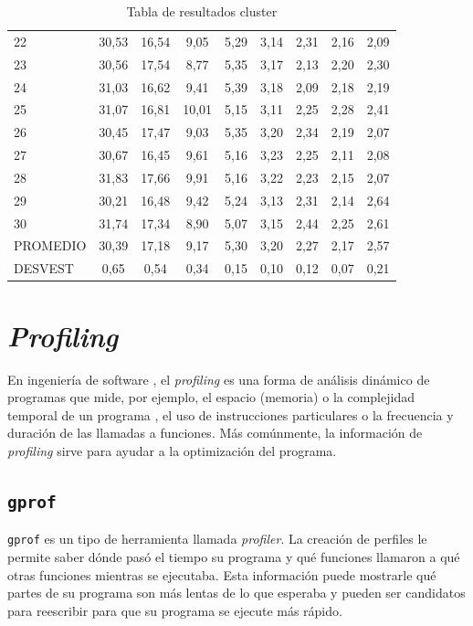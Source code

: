 \documentclass[a4paper]{article}
\begin{document}
\begin{table}[H]
\begin{tabular}{lcccccccc}
22       & 30,53 & 16,54 & 9,05  & 5,29 & 3,14 & 2,31 & 2,16 & 2,09 \\
23       & 30,56 & 17,54 & 8,77  & 5,35 & 3,17 & 2,13 & 2,20 & 2,30 \\
24       & 31,03 & 16,62 & 9,41  & 5,39 & 3,18 & 2,09 & 2,18 & 2,19 \\
25       & 31,07 & 16,81 & 10,01 & 5,15 & 3,11 & 2,25 & 2,28 & 2,41 \\
26       & 30,45 & 17,47 & 9,03  & 5,35 & 3,20 & 2,34 & 2,19 & 2,07 \\
27       & 30,67 & 16,45 & 9,61  & 5,16 & 3,23 & 2,25 & 2,11 & 2,08 \\
28       & 31,83 & 17,66 & 9,91  & 5,16 & 3,22 & 2,23 & 2,15 & 2,07 \\
29       & 30,21 & 16,48 & 9,42  & 5,24 & 3,13 & 2,31 & 2,14 & 2,64 \\
30       & 31,74 & 17,34 & 8,90  & 5,07 & 3,15 & 2,44 & 2,25 & 2,61 \\ \hline
PROMEDIO & 30,39 & 17,18 & 9,17  & 5,30 & 3,20 & 2,27 & 2,17 & 2,57 \\
DESVEST  & 0,65  & 0,54  & 0,34  & 0,15 & 0,10 & 0,12 & 0,07 & 0,21
\end{tabular}
\caption{Tabla de resultados cluster}
\label{tab:tablecluster}
\end{table}

\section{\textit{Profiling}}
En ingeniería de software , el \textit{profiling} es una forma de análisis dinámico de programas que mide, por ejemplo, el espacio (memoria) o la complejidad temporal de un programa , el uso de instrucciones particulares o la frecuencia y duración de las llamadas a funciones. Más comúnmente, la información de \textit{profiling} sirve para ayudar a la optimización del programa.

\clearpage

\subsection{\texttt{gprof}}
\texttt{gprof} es un tipo de herramienta llamada \textit{profiler}. La creación de perfiles le permite saber dónde pasó el tiempo su programa y qué funciones llamaron a qué otras funciones mientras se ejecutaba. Esta información puede mostrarle qué partes de su programa son más lentas de lo que esperaba y pueden ser candidatos para reescribir para que su programa se ejecute más rápido.
\end{document}
